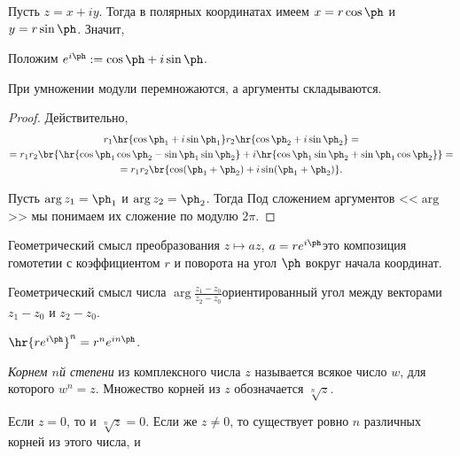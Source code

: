 \documentclass[a4paper]{article}
\begin{document}
Пусть $z = x+iy$. Тогда в полярных координатах имеем $x = r \cos \ph$ и $y = r\sin \ph$. Значит,

\begin{df}
Положим $e^{i\ph} := \cos \ph + i\sin \ph$.
\end{df}

\begin{stm}
При умножении модули перемножаются, а аргументы складываются.
\end{stm}
\begin{proof}
Действительно,
\begin{multline*}
r_1 \hr{\cos \ph_1 + i\sin \ph_1}r_2 \hr{\cos \ph_2 + i\sin \ph_2} =\\=
r_1 r_2 \br{\hr{\cos \ph_1 \cos \ph_2 - \sin \ph_1 \sin \ph_2} +
i\hr{\cos \ph _1 \sin \ph _2 + \sin \ph _1 \cos \ph _2}} =\\=
r_1 r_2 \br{\cos(\ph_1 + \ph _2) + i\sin(\ph_1 + \ph_2)}.
\end{multline*}

Пусть $\arg z_1 = \ph_1$ и $\arg z_2 = \ph_2$. Тогда
Под сложением аргументов <<$\arg$>> мы понимаем их сложение по модулю $2\pi$.
\end{proof}

\begin{imp}
Геометрический смысл преобразования $z \mapsto az$, $a = r e^{i\ph}$\т это композиция гомотетии с коэффициентом $r$
и поворота на угол $\ph$ вокруг начала координат.
\end{imp}

\begin{imp}
Геометрический смысл числа $\arg\frac{z_1 - z_0}{z_2 - z_0}$\т ориентированный угол между векторами $z_1-z_0$ и $z_2-z_0$.
\end{imp}

\begin{imp}
$\hr{re^{i\ph}}^n = r^ne^{in\ph}$.
\end{imp}

\begin{df}
\emph{Корнем $n$\д й степени} из комплексного числа $z$ называется всякое число $w$, для которого $w^n = z$.
Множество корней из $z$ обозначается $\sqrt[n]z$.
\end{df}

\begin{stm}
Если $z = 0$, то и $\sqrt[n]{z} = 0$. Если же $z \neq 0$, то существует ровно $n$ различных корней
из этого числа, и
\end{stm}
\end{document}
